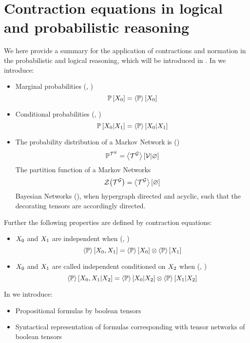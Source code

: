 \section{Contraction equations in logical and probabilistic reasoning}

We here provide a summary for the application of contractions and normation in the probabilistic and logical reasoning, which will be introduced in .
In  we introduce:
\begin{itemize}
	\item Marginal probabilities (, )
		\[ \mathbb{P}\left[X_{0}\right] = \left\langle \mathbb{P}\right\rangle \left[ X_{0} \right] \]
	\item Conditional probabilities (, )
		\[ \mathbb{P}\left[X_{0}|X_{1}\right] = \left\langle \mathbb{P}\right\rangle \left[ X_{0} | X_{1} \right] \]
	\item The probability distribution of a Markov Network is ()
		\begin{align*}
			\mathbb{P}^{\mathcal{T}^{\mathcal{G}}} = \left\langle \mathcal{T}^{\mathcal{G}}\right\rangle \left[ \mathcal{V} | \varnothing \right]
		\end{align*}
		The partition function of a Markov Networks
		\begin{align*}
			\mathcal{Z}{\left(\mathcal{T}^{\mathcal{G}}\right)} = \left\langle \mathcal{T}^{\mathcal{G}}\right\rangle \left[ \varnothing \right]
		\end{align*}
		Bayesian Networks (), when hypergraph directed and acyclic, such that the decorating tensors are accordingly directed.
\end{itemize}

Further the following properties are defined by contraction equations:
\begin{itemize}
	\item $X_{0}$ and $X_{1}$ are independent when (, )
		\[  \left\langle \mathbb{P}\right\rangle \left[ X_{0},X_{1} \right]
		=  \left\langle \mathbb{P}\right\rangle \left[ X_{0} \right]
			\otimes  \left\langle \mathbb{P}\right\rangle \left[ X_{1} \right] \]
	\item $X_{0}$ and $X_{1}$ are called independent conditioned on $X_{2}$ when (, )
		\[ \left\langle \mathbb{P}\right\rangle \left[ X_{0},X_{1} | X_{2} \right]
		= \left\langle \mathbb{P}\right\rangle \left[ X_{0} | X_{2} \right]
		\otimes \left\langle \mathbb{P}\right\rangle \left[ X_{1} | X_{2} \right] \]
\end{itemize}

In  we introduce:
\begin{itemize}
	\item Propositional formulas by boolean tensors
	\item Syntactical representation of formulas corresponding with tensor networks of boolean tensors
\end{itemize}